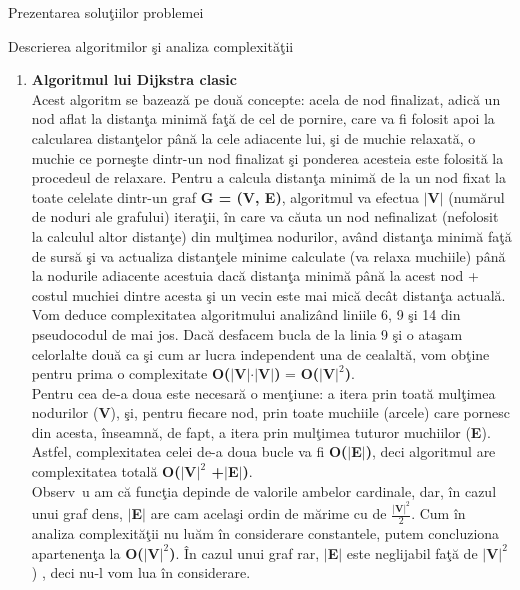 \documentclass[a4paper]{article}
\begin{document}

\begin{section}{Prezentarea solu\c tiilor problemei\\}

\begin{subsection}{Descrierea algoritmilor \c si analiza complexit\u a\c tii\\}

\begin{enumerate}

	\item \textbf{Algoritmul lui Dijkstra clasic} \\[0.4cm]
	Acest algoritm se bazeaz\u a pe dou\u a concepte: acela de nod finalizat, adic\u a un nod aflat la distan\c ta minim\u a fa\c t\u a de cel de pornire, care va fi folosit apoi la calcularea distan\c telor p\^ an\u a la cele adiacente lui, \c si de muchie relaxat\u a, o muchie ce porne\c ste dintr-un nod finalizat \c si ponderea acesteia este folosit\u a la procedeul de relaxare. Pentru a calcula distan\c ta minim\u a de la un nod fixat la toate celelate dintr-un graf \textbf{G = (V, E)}, algoritmul va efectua \textbf{$|$V$|$} (num\u arul de noduri ale grafului) itera\c tii, \^ in care va c\u auta un nod nefinalizat (nefolosit la calculul altor distan\c te) din mul\c timea nodurilor, av\^ and distan\c ta minim\u a fa\c t\u a de surs\u a \c si va actualiza distan\c tele minime calculate (va relaxa muchiile) p\^ an\u a la nodurile adiacente acestuia dac\u a distan\c ta minim\u a p\^ an\u a la acest nod + costul muchiei dintre acesta \c si un vecin este mai mic\u a dec\^ at distan\c ta actual\u a\cite{dijkstra}. \\
Vom deduce complexitatea algoritmului analiz\^ and liniile 6, 9 \c si 14 din pseudocodul de mai jos. Dac\u a desfacem bucla de la linia 9 \c si o ata\c sam celorlalte dou\u a ca \c si cum ar lucra independent una de cealalt\u a, vom ob\c tine pentru prima o complexitate \textbf{O($|$V$|$$\cdot$$|$V$|$)} = \textbf{O($|$V$|^2$)}. \\
Pentru cea de-a doua este necesar\u a o men\c tiune: a itera prin toat\u a mul\c timea nodurilor (\textbf{V}), \c si, pentru fiecare nod, prin toate muchiile (arcele) care pornesc din acesta, \^ inseamn\u a, de fapt, a itera prin mul\c timea tuturor muchiilor (\textbf{E}). Astfel, complexitatea celei de-a doua bucle va fi \textbf{O($|$E$|$)}, deci algoritmul are complexitatea total\u a \textbf{O($|$V$|^2$ +$|$E$|$)}. \\
Observ\ u am c\u a func\c tia depinde de valorile ambelor cardinale, dar, \^ in cazul unui graf dens, \textbf{$|$E$|$} are cam acela\c si ordin de m\u arime cu de $\frac{|\textbf{V}|^2}{2}$. Cum \^ in analiza complexit\u a\c tii nu lu\u am \^ in considerare constantele, putem concluziona apartenen\c ta la \textbf{O($|$V$|^2$)}. \^ In cazul unui graf rar, \textbf{$|$E$|$} este neglijabil fa\c t\u a de \textbf{$|$V$|^2$}) , deci nu-l vom lua \^ in considerare. \\


\end{enumerate}
\end{subsection}
\end{section}
\end{document}

